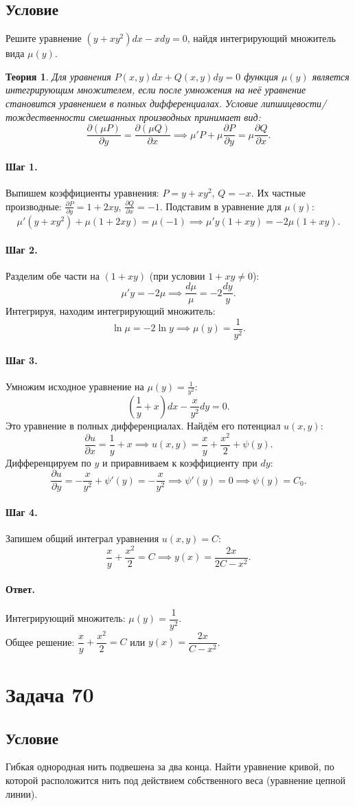 \documentclass[12pt,a4paper]{article}
\theoremstyle{solution}
\newtheorem*{theory}{Теория}
\newcommand{\task}[1]{\newpage\section*{Задача #1}}
\newcommand{\answer}{\paragraph{Ответ.}}
\newcommand{\step}[1]{\paragraph{Шаг #1.}}
\begin{document}
\subsection*{Условие}
Решите уравнение $(y + xy^2)dx - xdy = 0$, найдя интегрирующий множитель вида $\mu(y)$.

\begin{theory}
Для уравнения $P(x,y)dx + Q(x,y)dy = 0$ функция $\mu(y)$ является интегрирующим множителем, если после умножения на неё уравнение становится уравнением в полных дифференциалах. Условие липшицевости/тождественности смешанных производных принимает вид:
\[
\frac{\partial (\mu P)}{\partial y} = \frac{\partial (\mu Q)}{\partial x} \implies \mu' P + \mu \frac{\partial P}{\partial y} = \mu \frac{\partial Q}{\partial x}.
\]
\end{theory}

\step{1} Выпишем коэффициенты уравнения: $P = y + xy^2$, $Q = -x$.
Их частные производные: $\frac{\partial P}{\partial y} = 1 + 2xy$, $\frac{\partial Q}{\partial x} = -1$.
Подставим в уравнение для $\mu(y)$:
\[
\mu' (y + xy^2) + \mu (1 + 2xy) = \mu (-1) \implies \mu' y(1 + xy) = -2\mu (1 + xy).
\]

\step{2} Разделим обе части на $(1 + xy)$ (при условии $1 + xy \neq 0$):
\[
\mu' y = -2\mu \implies \frac{d\mu}{\mu} = -2 \frac{dy}{y}.
\]
Интегрируя, находим интегрирующий множитель:
\[
\ln \mu = -2 \ln y \implies \mu(y) = \frac{1}{y^2}.
\]

\step{3} Умножим исходное уравнение на $\mu(y) = \frac{1}{y^2}$:
\[
\left( \frac{1}{y} + x \right) dx - \frac{x}{y^2} dy = 0.
\]
Это уравнение в полных дифференциалах. Найдём его потенциал $u(x, y)$:
\[
\frac{\partial u}{\partial x} = \frac{1}{y} + x \implies u(x, y) = \frac{x}{y} + \frac{x^2}{2} + \psi(y).
\]
Дифференцируем по $y$ и приравниваем к коэффициенту при $dy$:
\[
\frac{\partial u}{\partial y} = -\frac{x}{y^2} + \psi'(y) = -\frac{x}{y^2} \implies \psi'(y) = 0 \implies \psi(y) = C_0.
\]

\step{4} Запишем общий интеграл уравнения $u(x, y) = C$:
\[
\frac{x}{y} + \frac{x^2}{2} = C \implies y(x) = \frac{2x}{2C - x^2}.
\]

\answer
Интегрирующий множитель: $\mu(y) = \dfrac{1}{y^2}$. \\
Общее решение: $\dfrac{x}{y} + \dfrac{x^2}{2} = C$ или $y(x) = \dfrac{2x}{C - x^2}$.

\task{70}
\subsection*{Условие}
Гибкая однородная нить подвешена за два конца. Найти уравнение кривой, по которой расположится нить под действием собственного веса (уравнение цепной линии).
\end{document}
